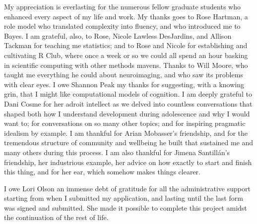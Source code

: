 {My appreciation is everlasting for the numerous fellow graduate students who enhanced every aspect of my life and work.
My thanks goes to Rose Hartman, a role model who translated complexity into fluency, and who introduced me to Bayes.
I am grateful, also, to Rose, Nicole Lawless DesJardins, and Allison Tackman for teaching me statistics; and to Rose and Nicole for establishing and cultivating R Club, where once a week or so we could all spend an hour basking in scientific computing with other methods mavens.
Thanks to Will Moore, who taught me everything he could about neuroimaging, and who saw its problems with clear eyes.
I owe Shannon Peak my thanks for suggesting, with a knowing grin, that I might like computational models of cognition.
I am deeply grateful to Dani Cosme for her adroit intellect as we delved into countless conversations that shaped both how I understand development during adolescence and why I would want to; for conversations on so many other topics; and for inspiring pragmatic idealism by example.
I am thankful for Arian Mobasser's friendship, and for the tremendous structure of community and wellbeing he built that sustained me and many others during this process.
I am also thankful for Jimena Santillán's friendship, her industrious example, her advice on how exactly to start and finish this thing, and for her ear, which somehow makes things clearer.

I owe Lori Olson an immense debt of gratitude for all the administrative support starting from when I submitted my application, and lasting until the last form was signed and submitted. 
She made it possible to complete this project amidst the continuation of the rest of life.

}
